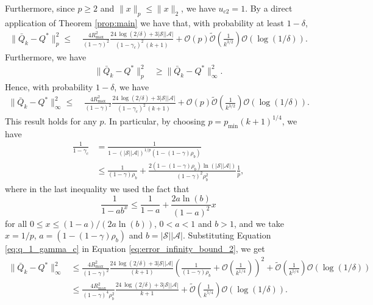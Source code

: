 \documentclass[letterpaper, 10 pt]{article}
\begin{document}
Furthermore, since $p\geq2$ and $ \|x\|_{p}\leq \|x\|_2$, we have $u_{c2}=1$. By a direct application of Theorem \ref{prop:main} we have that, with probability at least $1-\delta$,
\begin{align*}
\|\bar{Q}_k-Q^*\|_{p}^2 \le\; & \frac{4R_{\max}^2}{(1-\gamma)^2}\frac{24 \,\log(2/\delta)+3 |\mathcal{S}||\mathcal{A}| }{(1-\gamma_c)^2\,(k+1)} + \mathcal{O}(p)\tilde{\mathcal{O}}\left(\frac{1}{k^{3/2}}  \right) \mathcal{O}(\log(1/\delta)).
\end{align*}
Furthermore, we have 
\begin{align*}
    \|\bar{Q}_k-Q^*\|_{p}^2&\geq \|\bar{Q}_k-Q^*\|_{\infty}^2.
\end{align*}
Hence, with probability $1-\delta$, we have
\begin{align}
\|\bar{Q}_k-Q^*\|_{\infty}^2 \le\; & \frac{4R_{\max}^2}{(1-\gamma)^2}\frac{24 \,\log(2/\delta)+3 |\mathcal{S}||\mathcal{A}| }{(1-\gamma_c)^2\,(k+1)} + \mathcal{O}(p)\tilde{\mathcal{O}}\left(\frac{1}{k^{3/2}}  \right) \mathcal{O}(\log(1/\delta)).\label{eq:error_infinity_bound_2}
\end{align}
This result holds for any $p$. In particular, by choosing $p=p_{\min}(k+1)^{1/4}$, we have
\begin{align}
    \frac{1}{1-\gamma_c} &= \frac{1}{1-(|\mathcal{S}||\mathcal{A}|)^{1/p} \left(1-(1-\gamma)\rho_b\right)}\nonumber\\
    &\leq \frac{1}{(1-\gamma)\rho_b}+ \frac{2\left(1-(1-\gamma)\rho_b\right)\ln(|\mathcal{S}||\mathcal{A}|)}{(1-\gamma)^2\rho_b^2}\frac{1}{p}, \label{eq:q_1_gamma_c}
\end{align}
where in the last inequality we used the fact that
\[ \frac{1}{1-ab^x}\leq \frac{1}{1-a} + \frac{2a\ln(b)}{(1-a)^2}x \]
for all $0\leq x\leq (1-a)/(2a\ln(b))$, $0<a<1$ and $b>1$, and we take $x=1/p$, $a=\left(1-(1-\gamma) \rho_b\right)$ and $b=|\mathcal{S}||\mathcal{A}|$. Substituting Equation \eqref{eq:q_1_gamma_c} in Equation \eqref{eq:error_infinity_bound_2}, we get
\begin{align}
\|\bar{Q}_k-Q^*\|_{\infty}^2 &\leq \frac{4R_{\max}^2}{(1-\gamma)^2}\frac{24 \,\log(2/\delta)+3 |\mathcal{S}||\mathcal{A}| }{\,(k+1)} \left(\frac{1}{(1-\gamma)\rho_b}+ \mathcal{O}\left(\frac{1}{k^{1/4}}\right)\right)^2 + \tilde{\mathcal{O}}\left(\frac{1}{k^{5/4}}  \right) \mathcal{O}(\log(1/\delta))\nonumber\\
&\leq\frac{4R_{\max}^2}{(1-\gamma)^4\rho_b^2}\frac{24 \,\log(2/\delta)+3 |\mathcal{S}||\mathcal{A}| }{k+1}  + \tilde{\mathcal{O}}\left(\frac{1}{k^{5/4}}  \right) \mathcal{O}(\log(1/\delta)).\nonumber
\end{align}
\end{document}
